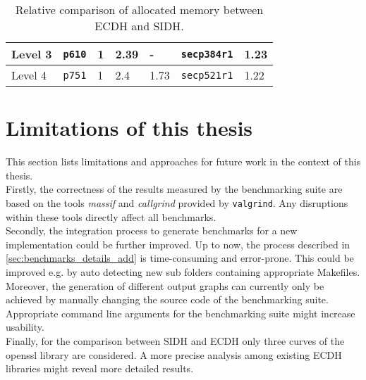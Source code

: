 \begin{table}[H]
\begin{tabular}{|K{1.8cm}|K{1.8cm}|K{1.8cm}|K{2cm}|K{1.8cm}|K{1.8cm}|K{1.8cm}|}
{}Level 3                                                                                                                                                 & {}\texttt{p610}                                                                    & {}1 & 2.39                                                                                                         & -               & {}\texttt{secp384r1}                                                               & 1.23               \\ 
\hline
{}Level 4                                                                                                                                                 & {}\texttt{p751}                                                                    & {}1 & 2.4                                                                                                          & 1.73            & {}\texttt{secp521r1}                                                               & 1.22               \\
\hline
\end{tabular}
\caption[Comparing allocated memory between \gls{ECDH} and \gls{SIDH}]{Relative comparison of allocated memory between \gls{ECDH} and \gls{SIDH}.}
\label{tab:conclusion_ecdh_sidh_mem}
\end{table}

\section{Limitations of this thesis}\label{sec:conclusion_limits}

This section lists limitations and approaches for future work in the context of this thesis.
\\
Firstly, the correctness of the results measured by the benchmarking suite are based on the tools \textit{massif} and \textit{callgrind} provided by \texttt{valgrind}. Any disruptions within these tools directly affect all benchmarks.
\\
Secondly, the integration process to generate benchmarks for a new implementation could be further improved. Up to now, the process described in \ref{sec:benchmarks_details_add} is time-consuming and error-prone. This could be improved e.g. by auto detecting new sub folders containing appropriate Makefiles. Moreover, the generation of different output graphs can currently only be achieved by manually changing the source code of the benchmarking suite. Appropriate command line arguments for the benchmarking suite might increase usability.
\\
Finally, for the comparison between \gls{SIDH} and \gls{ECDH} only three curves of the  \gls{openssl} library are considered. A more precise analysis among existing \gls{ECDH} libraries might reveal more detailed results.